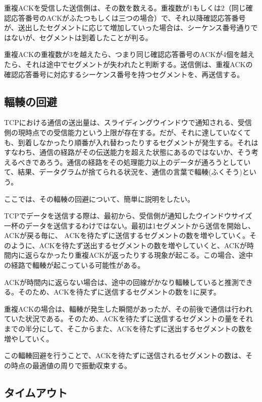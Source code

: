 重複ACKを受信した送信側は、その数を数える。重複数が1もしくは2（同じ確認応答番号のACKがふたつもしくは三つの場合）で、それ以降確認応答番号が、送出したセグメントに応じて増加していった場合は、シーケンス番号通りではないが、セグメントは到着したことが判る。

重複ACKの重複数が3を越えたら、つまり同じ確認応答番号のACKが4個を越えたら、それは途中でセグメントが失われたと判断する。送信側は、重複ACKの確認応答番号に対応するシーケンス番号を持つセグメントを、再送信する。

\subsection{輻輳の回避}

TCPにおける通信の送出量は、スライディングウインドウで通知される、受信側の現時点での受信能力という上限が存在する。だが、それに達していなくても、到着しなかったり順番が入れ替わったりするセグメントが発生する。それはすなわち、通信の経路がその伝送能力を超えた状態にあるのではないか、そう考えるべきであろう。通信の経路をその処理能力以上のデータが通ろうとしていて、結果、データグラムが捨てられる状況を、通信の言葉で輻輳(ふくそう)という。

ここでは、その輻輳の回避について、簡単に説明をしたい。

TCPでデータを送信する際は、最初から、受信側が通知したウインドウサイズ一杯のデータを送信するわけではない。最初は1セグメントから送信を開始し、ACKが戻る毎に、 ACKを待たずに送信するセグメントの数を増やしていく。そのように、ACKを待たず送出するセグメントの数を増やしていくと、ACKが時間内に返らなかったり重複ACKが返ったりする現象が起こる。この場合、途中の経路で輻輳が起こっている可能性がある。

ACKが時間内に返らない場合は、途中の回線がかなり輻輳していると推測できる。そのため、ACKを待たずに送信するセグメントの数を1に戻す。

重複ACKの場合は、輻輳が発生した瞬間があったが、その前後で通信は行われていた状況である。そのため、ACKを待たずに送信するセグメントの量をそれまでの半分にして、そこからまた、ACKを待たずに送出するセグメントの数を増やしていく。

この輻輳回避を行うことで、ACKを待たずに送信されるセグメントの数は、その時点の最適値の周りで振動収束する。



\subsection{タイムアウト}

